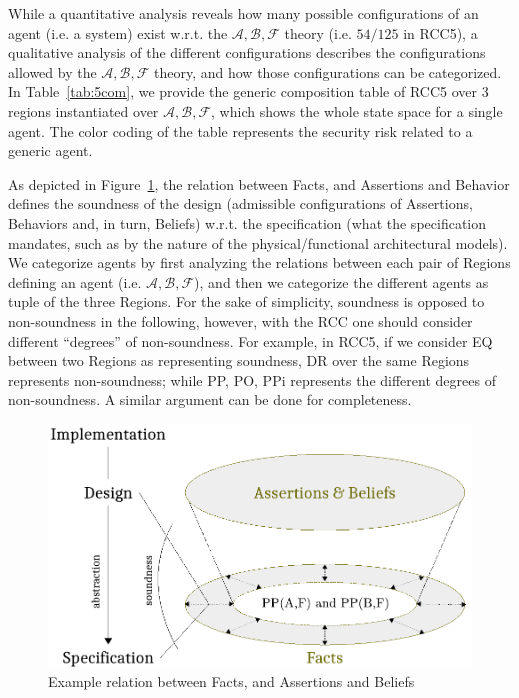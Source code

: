 \documentclass[conference]{IEEEtran}
\newcommand{\assertionRegion}{\mathcal{A}}
\newcommand{\beliefRegion}{\mathcal{B}}
\newcommand{\factRegion}{\mathcal{F}}
\newcommand{\abf}{\assertionRegion,\beliefRegion,\factRegion}
\begin{document}
While a quantitative analysis reveals how many possible configurations of an
agent (i.e. a system) exist w.r.t. the $\abf$ theory (i.e. $54/125$ in RCC5), a
qualitative analysis of the different configurations describes the
configurations allowed by the $\abf$ theory, and how those configurations can
be categorized.  In Table~\ref{tab:5com}, we provide the generic composition
table of RCC5 over 3 regions instantiated over $\abf$, which shows the whole
state space for a single agent. The color coding of the table represents the
security risk related to a generic agent. 

As depicted in Figure~\ref{fig:soundness}, the relation between Facts, and
Assertions and Behavior defines the soundness of the design (admissible
configurations of Assertions, Behaviors and, in turn, Beliefs) w.r.t. the
specification (what the specification mandates, such as by the nature of the
physical/functional architectural models). We categorize agents by first
analyzing the relations between each pair of Regions defining an agent (i.e.
$\abf$), and then we categorize the different agents as tuple of the three
Regions.  For the sake of simplicity, soundness is opposed to non-soundness in
the following, however, with the RCC one should consider different ``degrees''
of non-soundness. For example, in RCC5, if we consider EQ between two Regions
as representing soundness, DR over the same Regions represents non-soundness;
while PP, PO, PPi represents the different degrees of non-soundness.  A similar
argument can be done for completeness.  
\begin{figure}[t]
	\centering
	\includegraphics[width=\columnwidth]{soundness.pdf}
	\caption{Example relation between Facts, and Assertions and Beliefs}
	\label{fig:soundness}
\end{figure}
\end{document}
